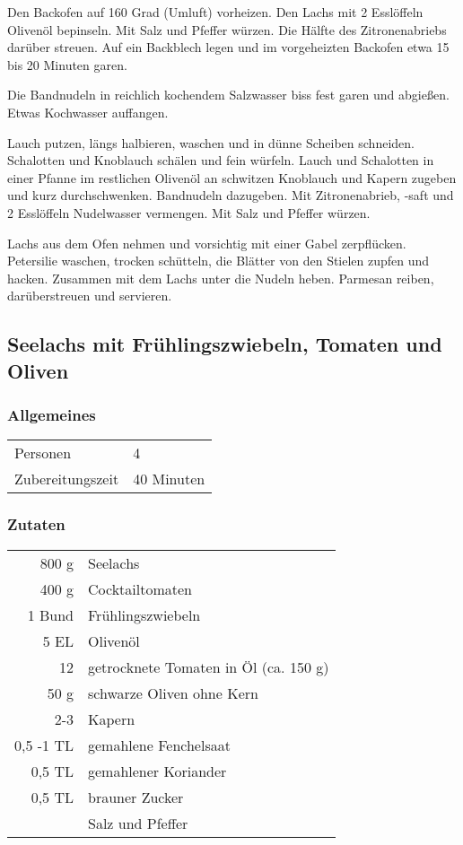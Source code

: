 Den Backofen auf 160 Grad (Umluft) vorheizen. Den Lachs mit 2 Esslöffeln Olivenöl bepinseln.
Mit Salz und Pfeffer würzen. Die Hälfte des Zitronenabriebs darüber streuen. Auf ein Backblech
legen und im vorgeheizten Backofen etwa 15 bis 20 Minuten garen. 

Die Bandnudeln in reichlich kochendem Salzwasser biss fest garen und abgießen. Etwas Kochwasser auffangen.

Lauch putzen, längs halbieren, waschen und in dünne Scheiben schneiden. Schalotten und Knoblauch schälen und fein würfeln.
Lauch und Schalotten in einer Pfanne im restlichen Olivenöl an schwitzen Knoblauch und Kapern zugeben und kurz durchschwenken. Bandnudeln dazugeben. Mit Zitronenabrieb, -saft und 2 Esslöffeln Nudelwasser vermengen. Mit Salz und Pfeffer würzen.

Lachs aus dem Ofen nehmen und vorsichtig mit einer Gabel zerpflücken. Petersilie waschen, trocken schütteln, die Blätter von den Stielen zupfen und hacken. Zusammen mit dem Lachs unter die Nudeln heben. Parmesan reiben, darüberstreuen und servieren.



\subsection{Seelachs mit Frühlingszwiebeln, Tomaten und Oliven}\label{sec:SeeLachs:TomatenOliven}
\subsubsection*{Allgemeines}
\begin{tabular}{ll}
    Personen         &  4   \\
    Zubereitungszeit & 40 Minuten  \\
\end{tabular} 
\subsubsection*{Zutaten}
\begin{tabular}{r l}
        800 g & Seelachs                              \\
        400 g & Cocktailtomaten                       \\
       1 Bund & Frühlingszwiebeln                     \\
         5 EL & Olivenöl                              \\
           12 & getrocknete Tomaten in Öl (ca. 150 g) \\
         50 g & schwarze Oliven ohne Kern             \\
          2-3 & Kapern                                \\
    0,5 -1 TL & gemahlene Fenchelsaat                 \\
       0,5 TL & gemahlener Koriander                  \\
       0,5 TL & brauner Zucker                        \\
              & Salz und Pfeffer
\end{tabular}


